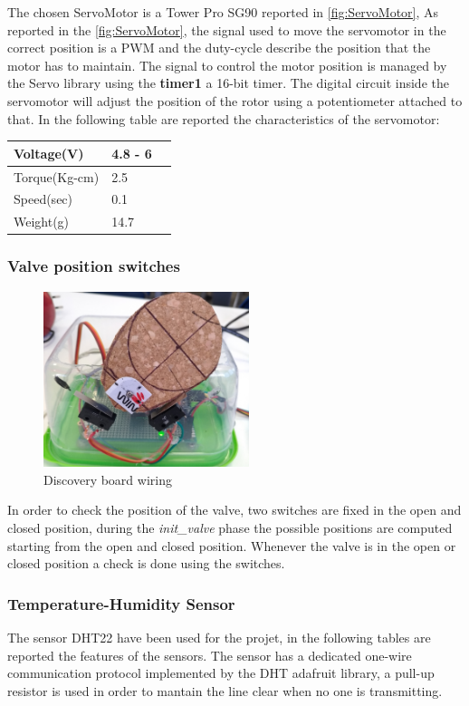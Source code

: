 	The chosen ServoMotor is a Tower Pro SG90 reported in \ref{fig:ServoMotor},
	As reported in the \ref{fig:ServoMotor}, the signal used to move the servomotor in the correct position is a PWM and the duty-cycle describe the position that the motor has to maintain.
	The signal to control the motor position is managed by the Servo library using the \textbf{timer1} a 16-bit timer.
	The digital circuit inside the servomotor will adjust the position of the rotor using a potentiometer attached to that.
	In the following table are reported	the characteristics of the servomotor:
	\begin{center}
		\begin{tabular}{||l | l | l||} 
			\hline
			Voltage(V) & 4.8 - 6 \\ 
			\hline
			Torque(Kg-cm) & 2.5 \\
			\hline
			Speed(sec) & 0.1 \\
			\hline
			Weight(g) & 14.7 \\
			\hline
		\end{tabular}
	\end{center}

\subsubsection{Valve position switches}
\begin{figure}[h]
	\centering
	\includegraphics[width=6cm,keepaspectratio]{img/valve}
	\caption{Discovery board wiring}
	\label{fig:valve}
\end{figure}
In order to check the position of the valve, two switches are fixed in the open and closed position, during the \textit{init\_valve} phase the possible positions are computed starting from the open and closed position.
Whenever the valve is in the open or closed position a check is done using the switches.

\subsubsection{Temperature-Humidity Sensor}
The sensor DHT22 have been used for the projet, in the following tables are reported the features of the sensors.
The sensor has a dedicated one-wire communication protocol implemented by the DHT adafruit library, a pull-up resistor is used in order to mantain the line clear when no one is transmitting.

